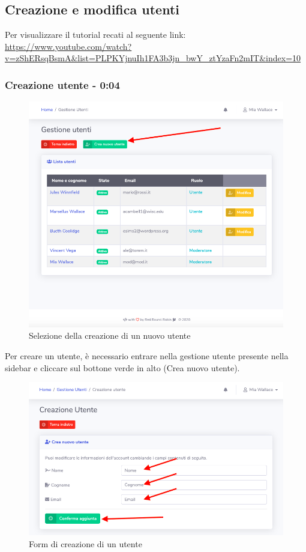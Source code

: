 \subsection{Creazione e modifica utenti}
Per visualizzare il tutorial recati al seguente link: 
\url{https://www.youtube.com/watch?v=zShERsqBsmA&list=PLPKYjnuIh1FA3b3jn_bwY_ztYzaFn2mIT&index=10}

	\subsubsection{Creazione utente - 0:04}
		\begin{figure}[H]
		\centering
		\includegraphics[scale=0.600]{res/images/mod/selCreazUtenti.png}
		\caption{Selezione della creazione di un nuovo utente}
	\end{figure}
		Per creare un utente, è necessario entrare nella gestione utente presente nella sidebar e cliccare sul bottone verde in alto (Crea nuovo utente).
		\begin{figure}[H]
		\centering
		\includegraphics[scale=0.600]{res/images/mod/creazUtente.png}
		\caption{Form di creazione di un utente}
	\end{figure}

